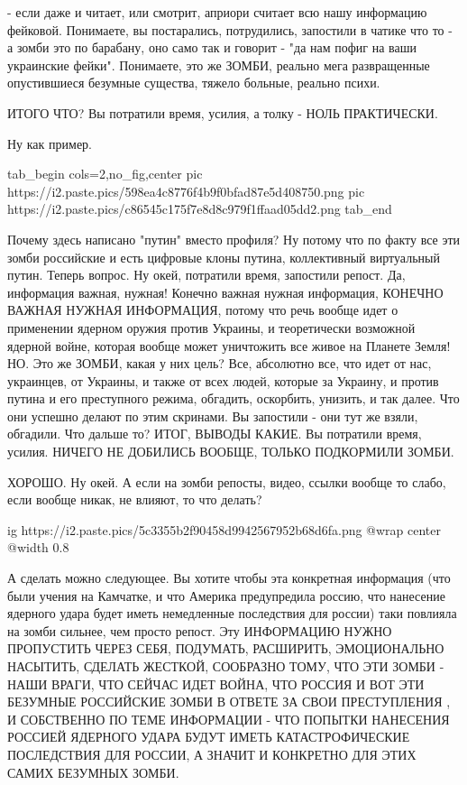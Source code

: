 - если даже и читает, или смотрит, априори считает всю нашу информацию
фейковой. Понимаете, вы постарались, потрудились, запостили в чатике что то - а
зомби это по барабану, оно само так и говорит - "да нам пофиг на ваши
украинские фейки". Понимаете, это же ЗОМБИ, реально мега развращенные
опустившиеся безумные существа, тяжело больные, реально психи. 

ИТОГО ЧТО? Вы потратили время, усилия, а толку - НОЛЬ ПРАКТИЧЕСКИ.

Ну как пример. 

\ifcmt
  tab_begin cols=2,no_fig,center
     pic https://i2.paste.pics/598ea4c8776f4b9f0bfad87e5d408750.png
		 pic https://i2.paste.pics/c86545c175f7e8d8c979f1ffaad05dd2.png
  tab_end
\fi

Почему здесь написано "путин" вместо профиля? Ну потому что по факту все эти
зомби российские и есть цифровые клоны путина, коллективный виртуальный путин.
Теперь вопрос. Ну окей, потратили время, запостили репост. Да, информация
важная, нужная! Конечно важная нужная информация, КОНЕЧНО ВАЖНАЯ НУЖНАЯ
ИНФОРМАЦИЯ, потому что речь вообще идет о применении ядерном оружия против
Украины, и теоретически возможной ядерной войне, которая вообще может
уничтожить все живое на Планете Земля! НО. Это же ЗОМБИ, какая у них цель? Все,
абсолютно все, что идет от нас, украинцев, от Украины, и также от всех людей,
которые за Украину, и против путина и его преступного режима, обгадить,
оскорбить, унизить, и так далее. Что они успешно делают по этим скринами. Вы
запостили - они тут же взяли, обгадили. Что дальше то? ИТОГ, ВЫВОДЫ КАКИЕ. Вы
потратили время, усилия. НИЧЕГО НЕ ДОБИЛИСЬ ВООБЩЕ, ТОЛЬКО ПОДКОРМИЛИ ЗОМБИ.

ХОРОШО. Ну окей. А если на зомби репосты, видео, ссылки вообще то слабо, если
вообще никак, не влияют, то что делать?

\ifcmt
  ig https://i2.paste.pics/5c3355b2f90458d9942567952b68d6fa.png
  @wrap center
  @width 0.8
\fi

А сделать можно следующее. Вы хотите чтобы эта конкретная информация (что были
учения на Камчатке, и что Америка предупредила россию, что нанесение ядерного
удара будет иметь немедленные последствия для россии) таки повлияла на зомби
сильнее, чем просто репост. Эту ИНФОРМАЦИЮ НУЖНО ПРОПУСТИТЬ ЧЕРЕЗ СЕБЯ,
ПОДУМАТЬ, РАСШИРИТЬ, ЭМОЦИОНАЛЬНО НАСЫТИТЬ, СДЕЛАТЬ ЖЕСТКОЙ, СООБРАЗНО ТОМУ,
ЧТО ЭТИ ЗОМБИ - НАШИ ВРАГИ, ЧТО СЕЙЧАС ИДЕТ ВОЙНА, ЧТО РОССИЯ И ВОТ ЭТИ
БЕЗУМНЫЕ РОССИЙСКИЕ ЗОМБИ В ОТВЕТЕ ЗА СВОИ ПРЕСТУПЛЕНИЯ , И СОБСТВЕННО ПО ТЕМЕ
ИНФОРМАЦИИ - ЧТО ПОПЫТКИ НАНЕСЕНИЯ РОССИЕЙ ЯДЕРНОГО УДАРА БУДУТ ИМЕТЬ
КАТАСТРОФИЧЕСКИЕ ПОСЛЕДСТВИЯ ДЛЯ РОССИИ, А ЗНАЧИТ И КОНКРЕТНО ДЛЯ ЭТИХ САМИХ
БЕЗУМНЫХ ЗОМБИ.
